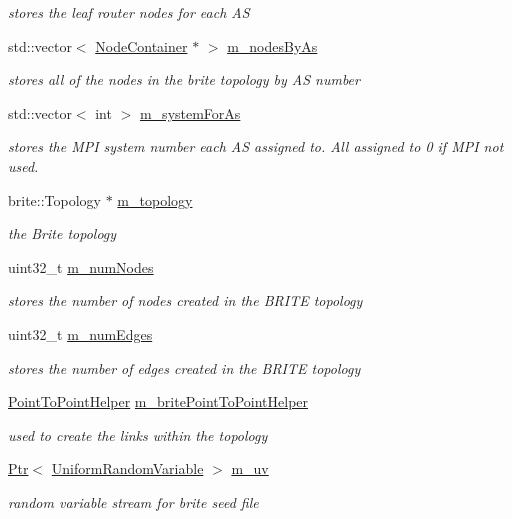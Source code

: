 \begin{DoxyCompactItemize}
\begin{DoxyCompactList}\small\item\em stores the leaf router nodes for each AS \end{DoxyCompactList}\item 
std\+::vector$<$ \hyperlink{classns3_1_1NodeContainer}{Node\+Container} $\ast$ $>$ \hyperlink{classns3_1_1BriteTopologyHelper_a4c310498d30b134d80a13fd7e56ed686}{m\+\_\+nodes\+By\+As}
\begin{DoxyCompactList}\small\item\em stores all of the nodes in the brite topology by AS number \end{DoxyCompactList}\item 
std\+::vector$<$ int $>$ \hyperlink{classns3_1_1BriteTopologyHelper_aa56519675fe45e2a494346de78acd14e}{m\+\_\+system\+For\+As}
\begin{DoxyCompactList}\small\item\em stores the M\+PI system number each AS assigned to. All assigned to 0 if M\+PI not used. \end{DoxyCompactList}\item 
brite\+::\+Topology $\ast$ \hyperlink{classns3_1_1BriteTopologyHelper_a1756fddb45019b7ed9a9e3bbc0e479c6}{m\+\_\+topology}
\begin{DoxyCompactList}\small\item\em the Brite topology \end{DoxyCompactList}\item 
uint32\+\_\+t \hyperlink{classns3_1_1BriteTopologyHelper_a19e2e5830df1074b65acadb096ef054f}{m\+\_\+num\+Nodes}
\begin{DoxyCompactList}\small\item\em stores the number of nodes created in the B\+R\+I\+TE topology \end{DoxyCompactList}\item 
uint32\+\_\+t \hyperlink{classns3_1_1BriteTopologyHelper_a3b6ab85e6ae0761f2936ae0f3b4c65da}{m\+\_\+num\+Edges}
\begin{DoxyCompactList}\small\item\em stores the number of edges created in the B\+R\+I\+TE topology \end{DoxyCompactList}\item 
\hyperlink{classns3_1_1PointToPointHelper}{Point\+To\+Point\+Helper} \hyperlink{classns3_1_1BriteTopologyHelper_a058e081bd812f0923de3255e798e0571}{m\+\_\+brite\+Point\+To\+Point\+Helper}
\begin{DoxyCompactList}\small\item\em used to create the links within the topology \end{DoxyCompactList}\item 
\hyperlink{classns3_1_1Ptr}{Ptr}$<$ \hyperlink{classns3_1_1UniformRandomVariable}{Uniform\+Random\+Variable} $>$ \hyperlink{classns3_1_1BriteTopologyHelper_a0e2cdc4462c8e1fc2c096878cb5cdd7e}{m\+\_\+uv}
\begin{DoxyCompactList}\small\item\em random variable stream for brite seed file \end{DoxyCompactList}\end{DoxyCompactItemize}
